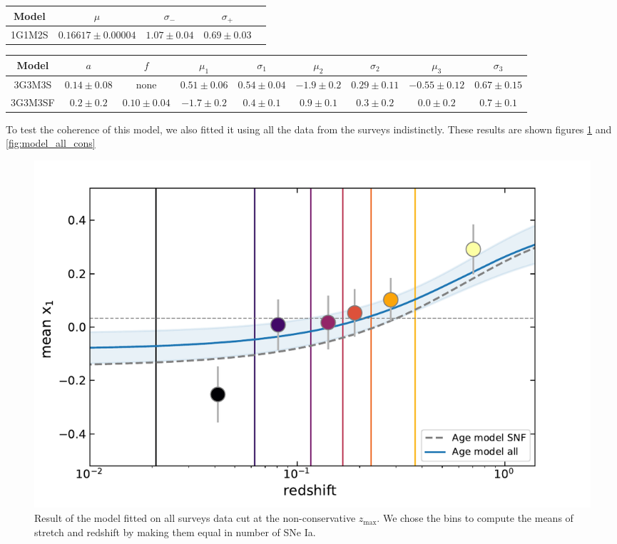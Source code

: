 \documentclass[]{aa} %
\begin{document}
\begin{table}[htbp!]
\begin{tabular}{c c c c c}\hline\hline

    Model & $\mu$ & $\sigma_-$ & $\sigma_+$ \\\hline

    1G1M2S & $0.16617 \pm 0.00004$ & $1.07 \pm 0.04$ & $0.69 \pm 0.03$ \\\hline

\end{tabular} \bigbreak

\begin{tabular}{c c c c c c c c c}\hline\hline

    Model & $a$ & $f$ & $\mu_1$ & $\sigma_1$ & $\mu_2$ & $\sigma_2$ &
    $\mu_3$ & $\sigma_3$ \\\hline

    3G3M3S & $0.14 \pm 0.08$ & none & $0.51 \pm 0.06$ & $0.54 \pm 0.04$ & $-1.9
    \pm 0.2$ & $0.29 \pm 0.11$ & $-0.55 \pm 0.12$ & $0.67 \pm 0.15$ \\
    
    3G3M3SF & $0.2 \pm 0.2 $ & $0.10 \pm 0.04 $ & $-1.7 \pm 0.2$ & $0.4 \pm 0.1$
            & $0.9 \pm 0.1$ & $0.3 \pm 0.2$ & $0.0 \pm 0.2$ & $0.7 \pm 0.1$
            \\\hline

\end{tabular} \bigbreak

\end{table}

To test the coherence of this model, we also fitted it using all the data from the surveys indistinctly. These results are shown figures \ref{fig:model_all} and \ref{fig:model_all_cons}


\begin{figure}
    \centering
    \includegraphics[width=\linewidth]{Article_figures/stretchevol_all_vs_snf_maglim_sup.pdf}
    \caption{Result of the model fitted on all surveys data cut at the non-conservative $z_{\mathrm{max}}$. We chose the bins to compute the means of stretch and redshift by making them equal in number of SNe Ia.}
    \label{fig:model_all}
\end{figure}
\end{document}
